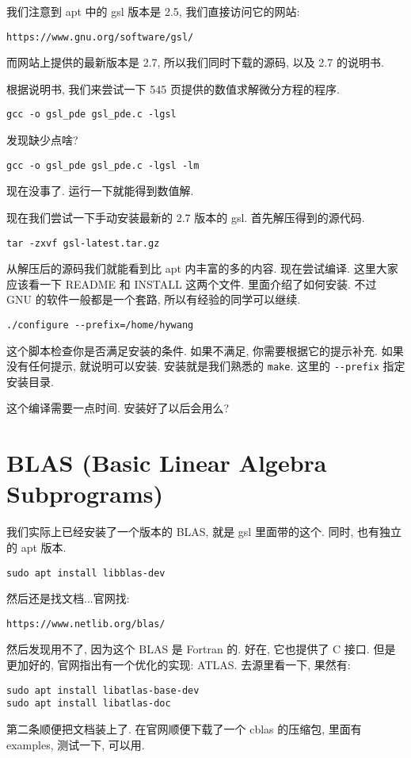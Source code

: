 \documentclass[a4paper]{ctexart}
\begin{document}
我们注意到 apt 中的 gsl 版本是 2.5, 我们直接访问它的网站:
\begin{verbatim}
https://www.gnu.org/software/gsl/
\end{verbatim}
而网站上提供的最新版本是 2.7,
所以我们同时下载的源码, 以及 2.7 的说明书. 


根据说明书, 我们来尝试一下 545 页提供的数值求解微分方程的程序.
\begin{verbatim}
gcc -o gsl_pde gsl_pde.c -lgsl 
\end{verbatim}
发现缺少点啥?
\begin{verbatim}
gcc -o gsl_pde gsl_pde.c -lgsl -lm
\end{verbatim}
现在没事了. 运行一下就能得到数值解.

现在我们尝试一下手动安装最新的 2.7 版本的 gsl. 首先解压得到的源代码.
\begin{verbatim}
tar -zxvf gsl-latest.tar.gz
\end{verbatim}
从解压后的源码我们就能看到比 apt 内丰富的多的内容. 现在尝试编译. 这里大家应该看一下
README 和 INSTALL 这两个文件. 里面介绍了如何安装. 不过 GNU 的软件一般都是一个套路,
所以有经验的同学可以继续.

\begin{verbatim}
./configure --prefix=/home/hywang
\end{verbatim}
这个脚本检查你是否满足安装的条件. 如果不满足, 你需要根据它的提示补充. 如果没有任何提示,
就说明可以安装. 安装就是我们熟悉的 \verb|make|. 这里的 \verb|--prefix| 指定安装目录.

这个编译需要一点时间. 安装好了以后会用么?

\section{BLAS (Basic Linear Algebra Subprograms)}

我们实际上已经安装了一个版本的 BLAS, 就是 gsl 里面带的这个. 同时, 也有独立的 apt 版本.
\begin{verbatim}
sudo apt install libblas-dev
\end{verbatim}

然后还是找文档...官网找:
\begin{verbatim}
https://www.netlib.org/blas/
\end{verbatim}

然后发现用不了, 因为这个 BLAS 是 Fortran 的. 好在, 它也提供了 C 接口. 但是更加好的,
官网指出有一个优化的实现: ATLAS. 去源里看一下, 果然有:
\begin{verbatim}
sudo apt install libatlas-base-dev
sudo apt install libatlas-doc
\end{verbatim}
第二条顺便把文档装上了. 在官网顺便下载了一个 cblas 的压缩包, 里面有 examples,
测试一下, 可以用.
\end{document}
